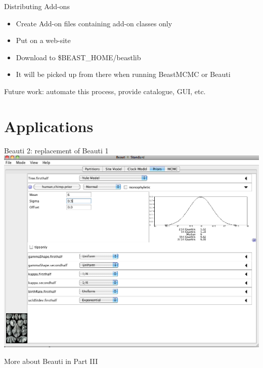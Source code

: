 \documentclass{beamer}
\theoremstyle{definition}
\begin{document}
\begin{frame}{Distributing Add-ons}

\begin{itemize}
\item Create Add-on files containing add-on classes only
\item Put on a web-site
\item Download to \$BEAST\_HOME/beastlib
\item It will be picked up from there when running BeastMCMC or Beauti
\end{itemize}

Future work: automate this process, provide catalogue, GUI, etc.

\end{frame}


\section{Applications}

\begin{frame}{Beauti 2: replacement of Beauti 1}
\includegraphics[width=\textwidth]{beauti.png}

More about Beauti in Part III
\end{frame}
\end{document}
